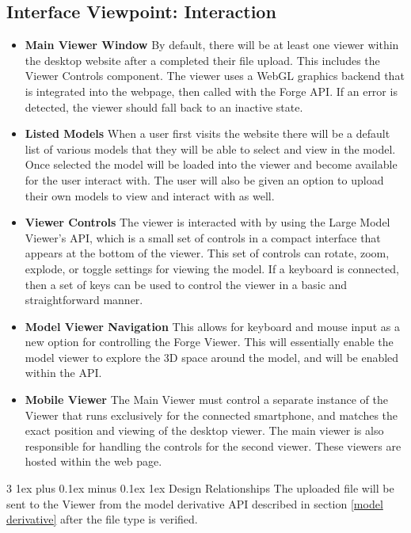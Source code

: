 \documentclass[letterpaper, 10pt, draftclsnofoot, compsoc, onecolumn]{IEEEtran}
\makeatletter
\def\subsubsection{\@startsection{subsubsection}%
                                 {3}%
                                 {\z@}%
                                 {1ex plus 0.1ex minus 0.1ex}%
                                 {1ex}%
                                 {\normalfont\normalsize}}%
\makeatother
\begin{document}
\subsection{Interface Viewpoint: Interaction}
\begin{itemize}
	\item[]\textbf{Main Viewer Window} By default, there will be at least one viewer within the desktop website after a completed their file upload.  This includes the Viewer Controls component. The viewer uses a WebGL graphics backend that is integrated into the webpage, then called with the Forge API. If an error is detected, the viewer should fall back to an inactive state.

	\item[]\textbf{Listed Models} When a user first visits the website there will be a default list of various models that they will be able to select and view in the model. Once selected the model will be loaded into the viewer and become available for the user interact with. The user will also be given an option to upload their own models to view and interact with as well. 
	
	\item[]\textbf{Viewer Controls} The viewer is interacted with by using the Large Model Viewer's API, which is a small set of controls in a compact interface that appears at the bottom of the viewer. This set of controls can rotate, zoom, explode, or toggle settings for viewing the model. If a keyboard is connected, then a set of keys can be used to control the viewer in a basic and straightforward manner.
	
	\item[]\textbf{Model Viewer Navigation} This allows for keyboard and mouse input as a new option for controlling the Forge Viewer. This will essentially enable the model viewer to explore the 3D space around the model, and will be enabled within the API.

	\item[]\textbf{Mobile Viewer} The Main Viewer must control a separate instance of the Viewer that runs exclusively for the connected smartphone, and matches the exact position and viewing of the desktop viewer. The main viewer is also responsible for handling the controls for the second viewer. These viewers are hosted within the web page.
	

\end{itemize}
\subsubsection{Design Relationships}
	The uploaded file will be sent to the Viewer from the model derivative API described in section \ref{model derivative} after the file type is verified.
	
\end{document}
